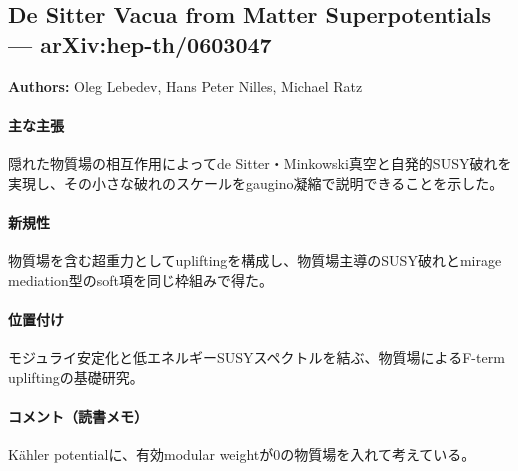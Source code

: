 \subsection{De Sitter Vacua from Matter Superpotentials --- arXiv:hep-th/0603047}

\textbf{Authors:} Oleg Lebedev, Hans Peter Nilles, Michael Ratz

\paragraph{主な主張}
隠れた物質場の相互作用によってde Sitter・Minkowski真空と自発的SUSY破れを実現し、その小さな破れのスケールをgaugino凝縮で説明できることを示した\cite{Lebedev:2006qq}。

\paragraph{新規性}
物質場を含む超重力としてupliftingを構成し、物質場主導のSUSY破れとmirage mediation型のsoft項を同じ枠組みで得た。

\paragraph{位置付け}
モジュライ安定化と低エネルギーSUSYスペクトルを結ぶ、物質場によるF-term upliftingの基礎研究。

\paragraph{コメント（読書メモ）}
K\"ahler potentialに、有効modular weightが0の物質場を入れて考えている。
